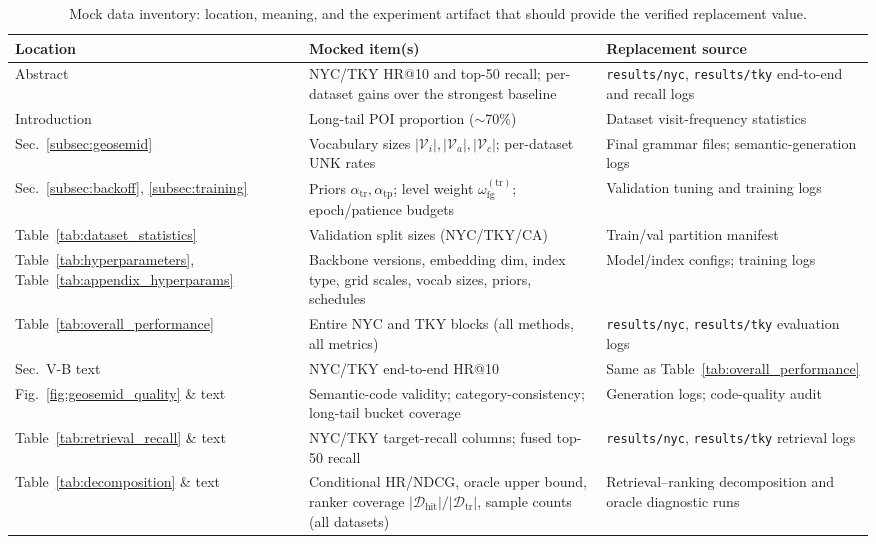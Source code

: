 \documentclass[journal]{IEEEtran}
\newcommand{\Train}{\mathcal{D}_{\mathrm{tr}}}
\newcommand{\HitTrain}{\mathcal{D}_{\mathrm{hit}}}
\begin{document}
\begin{table}[!t]
\centering
\footnotesize
\caption{Mock data inventory: location, meaning, and the experiment artifact that should provide the verified replacement value.}
\label{tab:mock_inventory}
\begin{tabular}{p{}p{}p{}}\toprule
Location & Mocked item(s) & Replacement source \\ \midrule
Abstract & NYC/TKY HR@10 and top-50 recall; per-dataset gains over the strongest baseline & \texttt{results/nyc}, \texttt{results/tky} end-to-end and recall logs \\
Introduction & Long-tail POI proportion ($\sim$70\%) & Dataset visit-frequency statistics \\
Sec.~\ref{subsec:geosemid} & Vocabulary sizes $|\mathcal V_i|,|\mathcal V_a|,|\mathcal V_c|$; per-dataset UNK rates & Final grammar files; semantic-generation logs \\
Sec.~\ref{subsec:backoff}, \ref{subsec:training} & Priors $\alpha_{\mathrm{tr}},\alpha_{\mathrm{tp}}$; level weight $\omega_{\mathrm{fg}}^{(\mathrm{tr})}$; epoch/patience budgets & Validation tuning and training logs \\
Table~\ref{tab:dataset_statistics} & Validation split sizes (NYC/TKY/CA) & Train/val partition manifest \\
Table~\ref{tab:hyperparameters}, Table~\ref{tab:appendix_hyperparams} & Backbone versions, embedding dim, index type, grid scales, vocab sizes, priors, schedules & Model/index configs; training logs \\
Table~\ref{tab:overall_performance} & Entire NYC and TKY blocks (all methods, all metrics) & \texttt{results/nyc}, \texttt{results/tky} evaluation logs \\
Sec.~V-B text & NYC/TKY end-to-end HR@10 & Same as Table~\ref{tab:overall_performance} \\
Fig.~\ref{fig:geosemid_quality} \& text & Semantic-code validity; category-consistency; long-tail bucket coverage & Generation logs; code-quality audit \\
Table~\ref{tab:retrieval_recall} \& text & NYC/TKY target-recall columns; fused top-50 recall & \texttt{results/nyc}, \texttt{results/tky} retrieval logs \\
Table~\ref{tab:decomposition} \& text & Conditional HR/NDCG, oracle upper bound, ranker coverage $|\HitTrain|/|\Train|$, sample counts (all datasets) & Retrieval--ranking decomposition and oracle diagnostic runs \\

\end{tabular}
\end{table}
\end{document}
